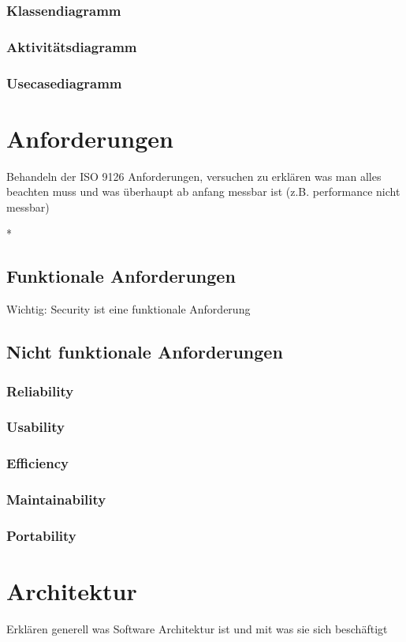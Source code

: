 \documentclass[Master,MSE,german]{twbook}
\begin{document}
\subsection{Klassendiagramm}
\subsection{Aktivitätsdiagramm}
\subsection{Usecasediagramm}


\chapter{Anforderungen}
Behandeln der ISO 9126 Anforderungen, versuchen zu erklären was man alles beachten muss und was überhaupt ab anfang messbar ist (z.B. performance nicht messbar)

*

\section{Funktionale Anforderungen}
Wichtig: Security ist eine funktionale Anforderung

\section{Nicht funktionale Anforderungen}
\subsection{Reliability}
\subsection{Usability}
\subsection{Efficiency}
\subsection{Maintainability}
\subsection{Portability}

\chapter{Architektur}
Erklären generell was Software Architektur ist und mit was sie sich beschäftigt
\end{document}
